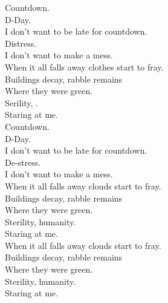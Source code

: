 
\label{album:sketches-of-brunswick-east}









Countdown. \\
D-Day. \\
I don't want to be late for countdown. \\
Distress. \\
I don't want to make a mess. \\

When it all falls away clothes start to fray. \\
Buildings decay, rabble remains \\
Where they were green. \\
Serility, . \\
Staring at me. \\

Countdown. \\
D-Day. \\
I don't want to be late for countdown. \\
De-stress. \\
I don't want to make a mess. \\

When it all falls away clouds start to fray. \\
Buildings decay, rabble remains \\
Where they were green. \\
Sterility, humanity. \\
Staring at me. \\

When it all falls away clouds start to fray. \\
Buildings decay, rabble remains \\
Where they were green. \\
Sterility, humanity. \\
Staring at me. \\

